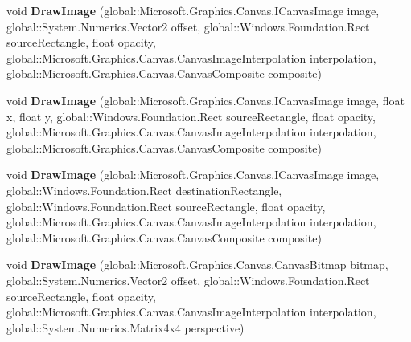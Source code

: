 \begin{DoxyCompactItemize}
void {\bfseries Draw\+Image} (global\+::\+Microsoft.\+Graphics.\+Canvas.\+I\+Canvas\+Image image, global\+::\+System.\+Numerics.\+Vector2 offset, global\+::\+Windows.\+Foundation.\+Rect source\+Rectangle, float opacity, global\+::\+Microsoft.\+Graphics.\+Canvas.\+Canvas\+Image\+Interpolation interpolation, global\+::\+Microsoft.\+Graphics.\+Canvas.\+Canvas\+Composite composite)
\item 
\mbox{\label{class_microsoft_1_1_graphics_1_1_canvas_1_1_canvas_drawing_session_a9d48be4c8e49a97cd2b0188a5608a92f}} 
void {\bfseries Draw\+Image} (global\+::\+Microsoft.\+Graphics.\+Canvas.\+I\+Canvas\+Image image, float x, float y, global\+::\+Windows.\+Foundation.\+Rect source\+Rectangle, float opacity, global\+::\+Microsoft.\+Graphics.\+Canvas.\+Canvas\+Image\+Interpolation interpolation, global\+::\+Microsoft.\+Graphics.\+Canvas.\+Canvas\+Composite composite)
\item 
\mbox{\label{class_microsoft_1_1_graphics_1_1_canvas_1_1_canvas_drawing_session_a067a36d992b31189118ee74ab73c7546}} 
void {\bfseries Draw\+Image} (global\+::\+Microsoft.\+Graphics.\+Canvas.\+I\+Canvas\+Image image, global\+::\+Windows.\+Foundation.\+Rect destination\+Rectangle, global\+::\+Windows.\+Foundation.\+Rect source\+Rectangle, float opacity, global\+::\+Microsoft.\+Graphics.\+Canvas.\+Canvas\+Image\+Interpolation interpolation, global\+::\+Microsoft.\+Graphics.\+Canvas.\+Canvas\+Composite composite)
\item 
\mbox{\label{class_microsoft_1_1_graphics_1_1_canvas_1_1_canvas_drawing_session_a32ea31e23a5f575dbea3e701c1110400}} 
void {\bfseries Draw\+Image} (global\+::\+Microsoft.\+Graphics.\+Canvas.\+Canvas\+Bitmap bitmap, global\+::\+System.\+Numerics.\+Vector2 offset, global\+::\+Windows.\+Foundation.\+Rect source\+Rectangle, float opacity, global\+::\+Microsoft.\+Graphics.\+Canvas.\+Canvas\+Image\+Interpolation interpolation, global\+::\+System.\+Numerics.\+Matrix4x4 perspective)
\item 
\mbox{\label{class_microsoft_1_1_graphics_1_1_canvas_1_1_canvas_drawing_session_a2f13c0851b00cd4fdfc70bcb3e91686c}} 

\end{DoxyCompactItemize}
